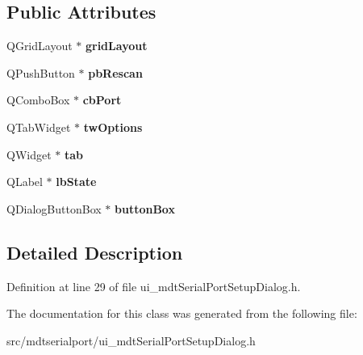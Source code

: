 \subsection*{Public Attributes}
\begin{DoxyCompactItemize}
\item 
\hypertarget{class_ui__mdt_serial_port_setup_dialog_a13a11e9f9ccf2a2b55dcb9b90fb4db94}{
QGridLayout $\ast$ {\bfseries gridLayout}}
\label{class_ui__mdt_serial_port_setup_dialog_a13a11e9f9ccf2a2b55dcb9b90fb4db94}

\item 
\hypertarget{class_ui__mdt_serial_port_setup_dialog_a00ab731bc8c63f64ef981783f3434c17}{
QPushButton $\ast$ {\bfseries pbRescan}}
\label{class_ui__mdt_serial_port_setup_dialog_a00ab731bc8c63f64ef981783f3434c17}

\item 
\hypertarget{class_ui__mdt_serial_port_setup_dialog_afbf0c0bf5fe40ba41986a4548dd32ad1}{
QComboBox $\ast$ {\bfseries cbPort}}
\label{class_ui__mdt_serial_port_setup_dialog_afbf0c0bf5fe40ba41986a4548dd32ad1}

\item 
\hypertarget{class_ui__mdt_serial_port_setup_dialog_a679def9ad26fd3b5d14ce47c0445dae9}{
QTabWidget $\ast$ {\bfseries twOptions}}
\label{class_ui__mdt_serial_port_setup_dialog_a679def9ad26fd3b5d14ce47c0445dae9}

\item 
\hypertarget{class_ui__mdt_serial_port_setup_dialog_a2fba2d05e85b4d015d317703637d387f}{
QWidget $\ast$ {\bfseries tab}}
\label{class_ui__mdt_serial_port_setup_dialog_a2fba2d05e85b4d015d317703637d387f}

\item 
\hypertarget{class_ui__mdt_serial_port_setup_dialog_a8b460fe6e70b33cc1d5a988732bc918c}{
QLabel $\ast$ {\bfseries lbState}}
\label{class_ui__mdt_serial_port_setup_dialog_a8b460fe6e70b33cc1d5a988732bc918c}

\item 
\hypertarget{class_ui__mdt_serial_port_setup_dialog_ad838e2dd8bbfeb9c9dc084d1f7d3e023}{
QDialogButtonBox $\ast$ {\bfseries buttonBox}}
\label{class_ui__mdt_serial_port_setup_dialog_ad838e2dd8bbfeb9c9dc084d1f7d3e023}

\end{DoxyCompactItemize}


\subsection{Detailed Description}


Definition at line 29 of file ui\_\-mdtSerialPortSetupDialog.h.



The documentation for this class was generated from the following file:\begin{DoxyCompactItemize}
\item 
src/mdtserialport/ui\_\-mdtSerialPortSetupDialog.h\end{DoxyCompactItemize}
